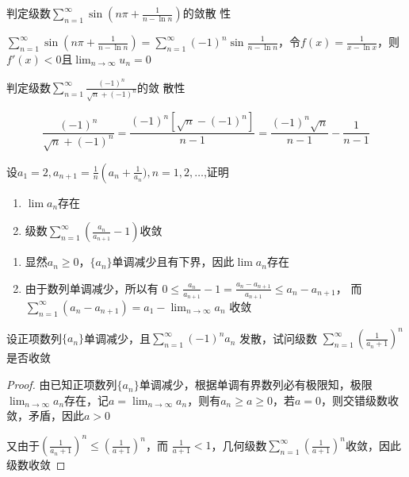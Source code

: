 \documentclass{article}
\begin{document}
\begin{examplle}[]
判定级数\(\displaystyle\sum_{n=1}^\infty\sin(n\pi+\frac{1}{n-\ln n})\)的敛散
性

\(\displaystyle\sum_{n=1}^\infty\sin(n\pi+\frac{1}{n-\ln
   n})=\sum_{n=1}^\infty(-1)^n\sin\frac{1}{n-\ln n}\)，令\(f(x)=\frac{1}{x-\ln
   x}\)，则\(f'(x)<0\)且\(\lim_{n\to\infty}u_n=0\)
\end{examplle}

\begin{examplle}[]
判定级数\(\displaystyle\sum_{n=1}^\infty\frac{(-1)^n}{\sqrt{n}+(-1)^n}\)的敛
散性

\begin{equation*}
\frac{(-1)^n}{\sqrt{n}+(-1)^n}=
\frac{(-1)^n[\sqrt{n}-(-1)^n]}{n-1}=
\frac{(-1)^n\sqrt{n}}{n-1}-\frac{1}{n-1}
\end{equation*}
\end{examplle}

\begin{examplle}[]
设\(a_1=2,a_{n+1}=\frac{1}{n}\left(a_n+\frac{1}{a_n}),n=1,2,\dots\),证明
\begin{enumerate}
\item \(\lim a_n\)存在
\item 级数\(\displaystyle\sum_{n=1}^\infty(\frac{a_n}{a_{n+1}}-1)\)收敛
\end{enumerate}


\begin{enumerate}
\item 显然\(a_n\ge0\)，\(\{a_n\}\)单调减少且有下界，因此\(\lim a_n\)存在
\item 由于数列单调减少，所以有
\(0\le\frac{a_n}{a_{n+1}}-1=\frac{a_n-a_{n+1}}{a_{n+1}}\le a_n-a_{n+1}\)，
而\(\displaystyle\sum_{n=1}^\infty(a_n-a_{n+1})=a_1-\lim_{n\to\infty}a_n\)
收敛
\end{enumerate}
\end{examplle}

\begin{examplle}[]
设正项数列\(\{a_n\}\)单调减少，且\(\displaystyle\sum_{n=1}^\infty(-1)^na_n\)
发散，试问级数
\(\displaystyle\sum_{n=1}^\infty\left(\frac{1}{a_n+1}\right)^n\)是否收敛
\end{examplle}

\begin{proof}
由已知正项数列\(\{a_n\}\)单调减少，根据单调有界数列必有极限知，极限
\(\lim_{n\to\infty}a_n\)存在，记\(a=\lim_{n\to\infty}a_n\)，则有\(a_n\ge
   a\ge0\)，若\(a=0\)，则交错级数收敛，矛盾，因此\(a>0\)

又由于\(\left(\frac{1}{a_n+1}\right)^n\le\left(\frac{1}{a+1}\right)^n\)，而
\(\frac{1}{a+1}<1\)，几何级数\(\sum_{n=1}^\infty(\frac{1}{a+1})^n\)收敛，因此
级数收敛
\end{proof}
\end{document}
